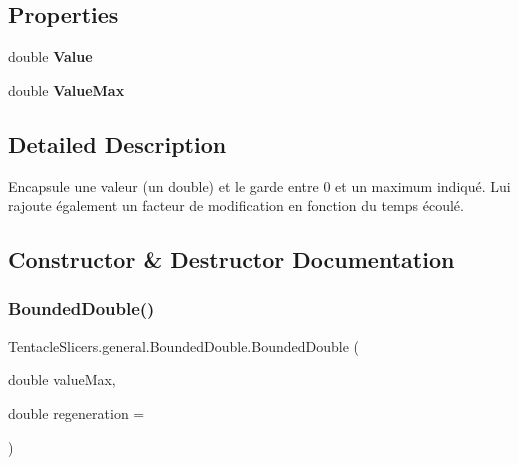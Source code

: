 \subsection*{Properties}
\begin{DoxyCompactItemize}
\item 
\mbox{\label{class_tentacle_slicers_1_1general_1_1_bounded_double_a2ae7e7e9bc916e1865c47a85e95b508d}} 
double {\bfseries Value}
\item 
\mbox{\label{class_tentacle_slicers_1_1general_1_1_bounded_double_ae051d04a428e97d0466113f3c9f66f3c}} 
double {\bfseries Value\+Max}
\end{DoxyCompactItemize}


\subsection{Detailed Description}
Encapsule une valeur (un double) et le garde entre 0 et un maximum indiqué. Lui rajoute également un facteur de modification en fonction du temps écoulé. 



\subsection{Constructor \& Destructor Documentation}
\mbox{\label{class_tentacle_slicers_1_1general_1_1_bounded_double_a7cd57e6a16c703eb5a6e574f5d73585f}} 
\subsubsection{\texorpdfstring{Bounded\+Double()}{BoundedDouble()}}
{\footnotesize\ttfamily Tentacle\+Slicers.\+general.\+Bounded\+Double.\+Bounded\+Double (\begin{DoxyParamCaption}\item[{double}]{value\+Max,  }\item[{double}]{regeneration = {} }\end{DoxyParamCaption})}



